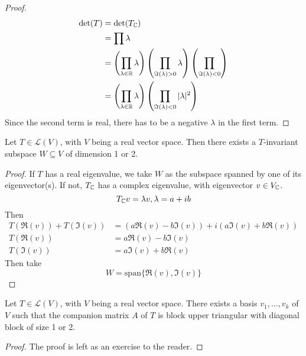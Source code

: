\documentclass[12pt]{article}
\begin{document}
\begin{proof}
    \begin{align*}
        \det(T) &= \det(T_{\mathbb{C}}) \\
                &= \prod \lambda \\
                &= \left(\prod_{\lambda \in \mathbb{R}} \lambda\right) \left(\prod_{\Im(\lambda) > 0} \lambda\right) \left(\prod_{\Im(\lambda) < 0}\right) \\
                &= \left(\prod_{\lambda \in \mathbb{R}} \lambda\right) \left(\prod_{\Im(\lambda) < 0} |\lambda|^2\right)
    \end{align*}
    Since the second term is real, there has to be a negative $\lambda$ in the first term.
\end{proof}

\begin{prop}
    Let $T \in \mathcal L(V)$, with $V$ being a real vector space. Then there exists a $T$-invariant subspace $W \subseteq V$ of dimension 1 or 2.
\end{prop}

\begin{proof}
    If $T$ has a real eigenvalue, we take $W$ as the subspace spanned by one of its eigenvector(s). If not, $T_{\mathbb{C}}$ has a complex eigenvalue, with eigenvector $v \in V_{\mathbb{C}}$.
    $$T_{\mathbb{C}}v = \lambda v, \lambda = a+ib$$
    Then
    \begin{align*}
        T(\Re(v)) + T(\Im(v)) &= (a\Re(v) - b\Im(v)) + i(a\Im(v) + b\Re(v)) \\
        T(\Re(v)) &= a\Re(v) - b\Im(v) \\
        T(\Im(v)) &= a\Im(v) + b\Re(v)
    \end{align*}
    Then take
    $$W = \text{span}\{\Re(v),\Im(v)\}$$
\end{proof}

\begin{prop}
    Let $T \in \mathcal L(V)$, with $V$ being a real vector space. There exists a basis $v_1,\dots,v_k$ of $V$ such that the companion matrix $A$ of $T$ is block upper triangular with diagonal block of size 1 or 2.
\end{prop}

\begin{proof}
    The proof is left as an exercise to the reader.
\end{proof}
\end{document}
